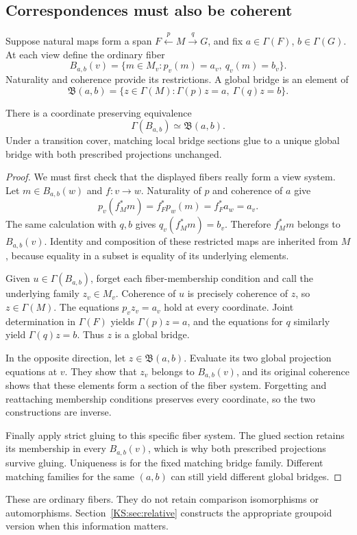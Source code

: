 \subsection{Correspondences must also be coherent}
Suppose natural maps form a span \(F\xleftarrow{p}M\xrightarrow{q}G\), and fix \(a\in\Gamma(F)\), \(b\in\Gamma(G)\). At each view define the ordinary fiber
\[
 B_{a,b}(v)=\{m\in M_v:p_v(m)=a_v,\ q_v(m)=b_v\}.
\]
Naturality and coherence provide its restrictions. A global bridge is an element of
\[
 \mathfrak B(a,b)=\{z\in\Gamma(M):\Gamma(p)z=a,\ \Gamma(q)z=b\}.
\]

\begin{KStheorem}\label{KS:KS06}
There is a coordinate preserving equivalence
\[
 \Gamma(B_{a,b})\simeq\mathfrak B(a,b).
\]
Under a transition cover, matching local bridge sections glue to a unique global bridge with both prescribed projections unchanged.
\end{KStheorem}
\begin{proof}
We must first check that the displayed fibers really form a view system. Let $m\in B_{a,b}(w)$ and $f:v\to w$. Naturality of $p$ and coherence of $a$ give
\[
 p_v(f_M^*m)=f_F^*p_w(m)=f_F^*a_w=a_v.
\]
The same calculation with $q,b$ gives $q_v(f_M^*m)=b_v$. Therefore $f_M^*m$ belongs to $B_{a,b}(v)$. Identity and composition of these restricted maps are inherited from $M$, because equality in a subset is equality of its underlying elements.

Given $u\in\Gamma(B_{a,b})$, forget each fiber-membership condition and call the underlying family $z_v\in M_v$. Coherence of $u$ is precisely coherence of $z$, so $z\in\Gamma(M)$. The equations $p_vz_v=a_v$ hold at every coordinate. Joint determination in $\Gamma(F)$ yields $\Gamma(p)z=a$, and the equations for $q$ similarly yield $\Gamma(q)z=b$. Thus $z$ is a global bridge.

In the opposite direction, let $z\in\mathfrak B(a,b)$. Evaluate its two global projection equations at $v$. They show that $z_v$ belongs to $B_{a,b}(v)$, and its original coherence shows that these elements form a section of the fiber system. Forgetting and reattaching membership conditions preserves every coordinate, so the two constructions are inverse.

Finally apply strict gluing to this specific fiber system. The glued section retains its membership in every $B_{a,b}(v)$, which is why both prescribed projections survive gluing. Uniqueness is for the fixed matching bridge family. Different matching families for the same $(a,b)$ can still yield different global bridges.
\end{proof}
These are ordinary fibers. They do not retain comparison isomorphisms or automorphisms. Section~\ref{KS:sec:relative} constructs the appropriate groupoid version when this information matters.

